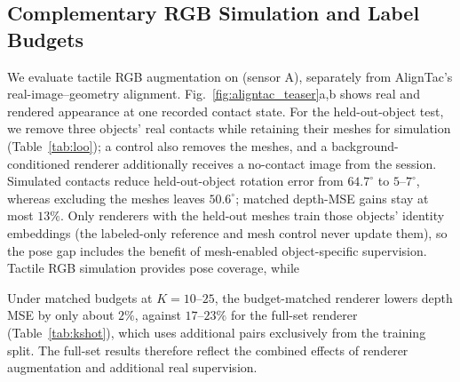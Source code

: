 \subsection{Complementary RGB Simulation and Label Budgets}
\label{sec:study}
We evaluate tactile RGB augmentation on \sensor{} (sensor A), separately from AlignTac's real-image--geometry alignment. Fig.~\ref{fig:aligntac_teaser}a,b shows real and rendered appearance at one recorded contact state. For the held-out-object test, we remove three objects' real contacts while retaining their meshes for simulation (Table~\ref{tab:loo}); a control also removes the meshes, and a background-conditioned renderer additionally receives a no-contact image from the session. Simulated contacts reduce held-out-object rotation error from $64.7^\circ$ to $5$--$7^\circ$, whereas excluding the meshes leaves $50.6^\circ$; matched depth-MSE gains stay at most $13\%$. Only renderers with the held-out meshes train those objects' identity embeddings (the labeled-only reference and mesh control never update them), so the pose gap includes the benefit of mesh-enabled object-specific supervision. Tactile RGB simulation provides pose coverage, while 

Under matched budgets at $K=10$--$25$, the budget-matched renderer lowers depth MSE by only about $2\%$, against $17$--$23\%$ for the full-set renderer (Table~\ref{tab:kshot}), which uses additional pairs exclusively from the training split. The full-set results therefore reflect the combined effects of renderer augmentation and additional real supervision.
